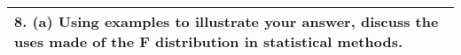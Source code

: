 \documentclass[a4paper,12pt]{article}
\begin{document}
\begin{table}[ht!]
     
\centering
     
\begin{tabular}{|p{15cm}|}
     
\hline 
8. (a) Using examples to illustrate your answer, discuss the uses made of the F distribution in
statistical methods.
\\ \hline
      
\end{tabular}
    
\end{table}


\end{document}
